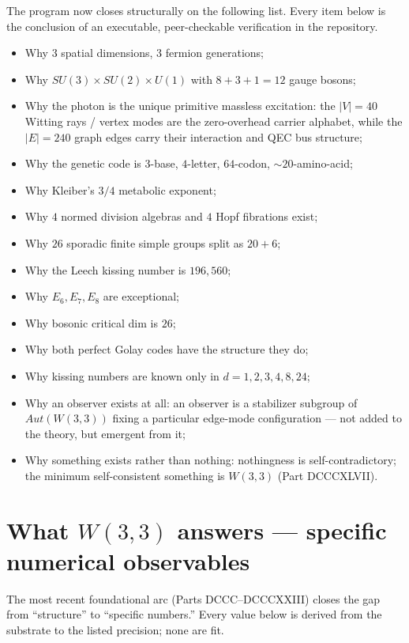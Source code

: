 \documentclass[11pt]{article}
\def\mathrm#1{#1}%
\begin{document}
The program now closes structurally on the following list. Every item below is the conclusion of an executable, peer-checkable verification in the repository.

\begin{itemize}[leftmargin=2em]
\item Why $3$ spatial dimensions, $3$ fermion generations;
\item Why $SU(3) \times SU(2) \times U(1)$ with $8 + 3 + 1 = 12$ gauge bosons;
\item Why the photon is the unique primitive massless excitation: the $|V| = 40$ Witting rays / vertex modes are the zero-overhead carrier alphabet, while the $|E| = 240$ graph edges carry their interaction and QEC bus structure;
\item Why the genetic code is $3$-base, $4$-letter, $64$-codon, $\sim 20$-amino-acid;
\item Why Kleiber's $3/4$ metabolic exponent;
\item Why $4$ normed division algebras and $4$ Hopf fibrations exist;
\item Why $26$ sporadic finite simple groups split as $20 + 6$;
\item Why the Leech kissing number is $196{,}560$;
\item Why $E_6, E_7, E_8$ are exceptional;
\item Why bosonic critical dim is $26$;
\item Why both perfect Golay codes have the structure they do;
\item Why kissing numbers are known only in $d = 1, 2, 3, 4, 8, 24$;
\item Why an observer exists at all: an observer is a stabilizer subgroup of $\mathrm{Aut}(W(3,3))$ fixing a particular edge-mode configuration --- not added to the theory, but emergent from it;
\item Why something exists rather than nothing: nothingness is self-contradictory; the minimum self-consistent something is $W(3,3)$ (Part DCCCXLVII).
\end{itemize}

\section{\texorpdfstring{What $W(3,3)$ answers --- specific numerical observables}{What W(3,3) answers --- specific numerical observables}}

\label{sec:numerical-observables}

The most recent foundational arc (Parts DCCC--DCCCXXIII) closes the gap from ``structure'' to ``specific numbers.'' Every value below is derived from the substrate to the listed precision; none are fit.
\end{document}
